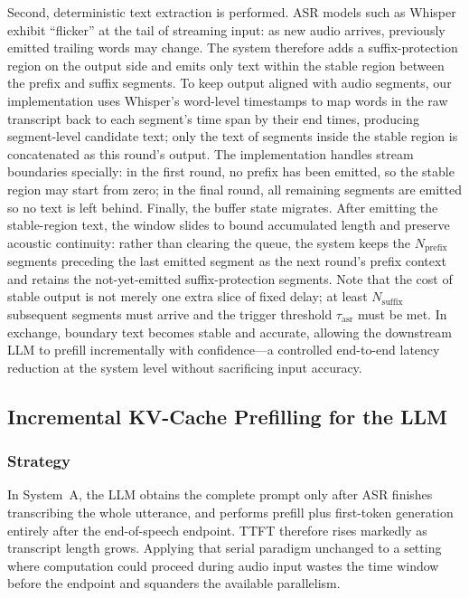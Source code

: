 \documentclass[conference]{IEEEtran}
\begin{document}
Second, deterministic text extraction is performed. ASR models such as Whisper exhibit ``flicker'' at the tail of streaming input: as new audio arrives, previously emitted trailing words may change. The system therefore adds a suffix-protection region on the output side and emits only text within the stable region between the prefix and suffix segments. To keep output aligned with audio segments, our implementation uses Whisper's word-level timestamps to map words in the raw transcript back to each segment's time span by their end times, producing segment-level candidate text; only the text of segments inside the stable region is concatenated as this round's output. The implementation handles stream boundaries specially: in the first round, no prefix has been emitted, so the stable region may start from zero; in the final round, all remaining segments are emitted so no text is left behind. Finally, the buffer state migrates. After emitting the stable-region text, the window slides to bound accumulated length and preserve acoustic continuity: rather than clearing the queue, the system keeps the $N_{\mathrm{prefix}}$ segments preceding the last emitted segment as the next round's prefix context and retains the not-yet-emitted suffix-protection segments. Note that the cost of stable output is not merely one extra slice of fixed delay; at least $N_{\mathrm{suffix}}$ subsequent segments must arrive and the trigger threshold $\tau_{\mathrm{asr}}$ must be met. In exchange, boundary text becomes stable and accurate, allowing the downstream LLM to prefill incrementally with confidence---a controlled end-to-end latency reduction at the system level without sacrificing input accuracy.

\subsection{Incremental KV-Cache Prefilling for the LLM}\label{sec:kv-prefill}

\subsubsection{Strategy}

In System~A, the LLM obtains the complete prompt only after ASR finishes transcribing the whole utterance, and performs prefill plus first-token generation entirely after the end-of-speech endpoint. TTFT therefore rises markedly as transcript length grows. Applying that serial paradigm unchanged to a setting where computation could proceed during audio input wastes the time window before the endpoint and squanders the available parallelism.
\end{document}
